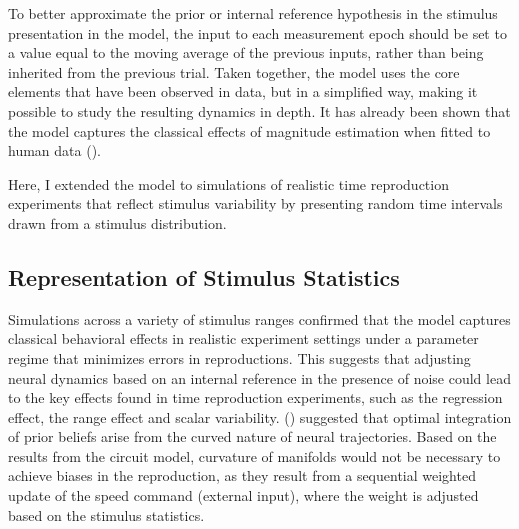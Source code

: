 \documentclass[10pt, a4paper]{article}
\begin{document}
To better approximate the prior or internal reference hypothesis in the stimulus presentation in the model, the input to each measurement epoch should be set to a value equal to the moving average of the previous inputs, rather than being inherited from the previous trial.  
Taken together, the model uses the core elements that have been observed in data, but in a simplified way, making it possible to study the resulting dynamics in depth. 
It has already been shown that the model captures the classical effects of magnitude estimation when fitted to human data (\cite{Egger2020}).

Here, I extended the model to simulations of realistic time reproduction experiments that reflect stimulus variability by presenting random time intervals drawn from a stimulus distribution.

\subsection{Representation of Stimulus Statistics}
Simulations across a variety of stimulus ranges confirmed that the model captures classical behavioral effects in realistic experiment settings under a parameter regime that minimizes errors in reproductions. %
This suggests that adjusting neural dynamics based on an internal reference in the presence of noise could lead to the key effects found in time reproduction experiments, such as the regression effect, the range effect and scalar variability. 
\citeauthor{Sohn2019} (\citeyear{Sohn2019}) suggested that optimal integration of prior beliefs arise from the curved nature of neural trajectories. Based on the results from the circuit model, curvature of manifolds would not be necessary to achieve biases in the reproduction, as they result from a sequential weighted update of the speed command (external input), where the weight is adjusted based on the stimulus statistics. 
\end{document}
